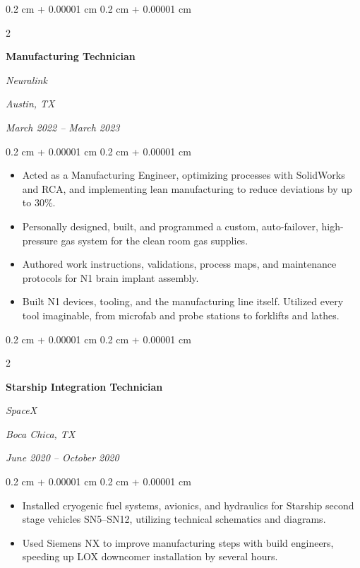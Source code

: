 \documentclass[10pt, letterpaper]{article}
\newenvironment{highlights}{
    \begin{itemize}[
        topsep=0.10 cm,
        parsep=0.10 cm,
        partopsep=0pt,
        itemsep=0pt,
        leftmargin=0.4 cm + 10pt
    ]
}{
    \end{itemize}
} %
\newenvironment{onecolentry}{
    \begin{adjustwidth}{
        0.2 cm + 0.00001 cm
    }{
        0.2 cm + 0.00001 cm
    }
}{
    \end{adjustwidth}
} %
\newenvironment{twocolentry}[2][]{
    \onecolentry
    \def\secondColumn{#2}
    \setcolumnwidth{\fill, 4.5 cm}
    \begin{paracol}{2}
}{
    \switchcolumn \raggedleft \secondColumn
    \end{paracol}
    \endonecolentry
} %
\begin{document}
        \vspace{0.35 cm}

        \begin{twocolentry}{
        \textit{Austin, TX}    
            
        \textit{March 2022 – March 2023}}
            \textbf{Manufacturing Technician}
            
            \textit{Neuralink}
        \end{twocolentry}

        \vspace{0.10 cm}
        \begin{onecolentry}
            \begin{highlights}
                \item Acted as a Manufacturing Engineer, optimizing processes with SolidWorks and RCA, and implementing lean manufacturing to reduce deviations by up to 30\%.
                \item Personally designed, built, and programmed a custom, auto-failover, high-pressure gas system for the clean room gas supplies.
                \item Authored work instructions, validations, process maps, and maintenance protocols for N1 brain implant assembly.
                \item Built N1 devices, tooling, and the manufacturing line itself. Utilized every tool imaginable, from microfab and probe stations to forklifts and lathes.
            \end{highlights}
        \end{onecolentry}

        \vspace{0.35 cm}

        \begin{twocolentry}{
        \textit{Boca Chica, TX}    
            
        \textit{June 2020 – October 2020}}
            \textbf{Starship Integration Technician}
            
            \textit{SpaceX}
        \end{twocolentry}

        \vspace{0.10 cm}
        \begin{onecolentry}
            \begin{highlights}
                \item Installed cryogenic fuel systems, avionics, and hydraulics for Starship second stage vehicles SN5–SN12, utilizing technical schematics and diagrams.
                \item Used Siemens NX to improve manufacturing steps with build engineers, speeding up LOX downcomer installation by several hours.
            \end{highlights}
        \end{onecolentry}
\end{document}
